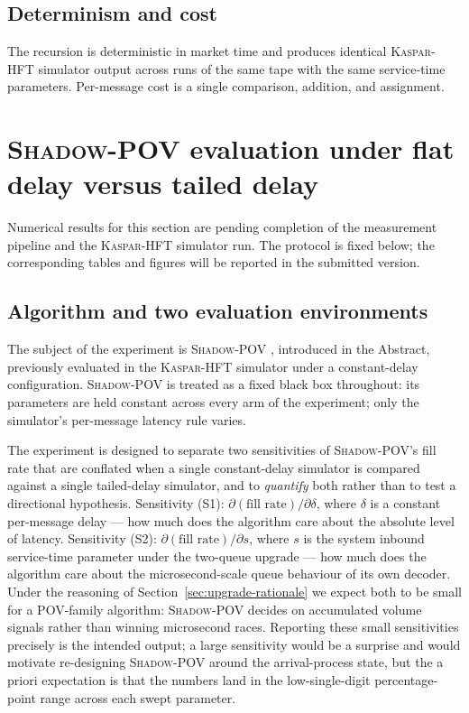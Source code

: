 \documentclass[11pt]{article}
\newcommand{\kasparhft}{\textsc{Kaspar-HFT}}
\newcommand{\shadowpov}{\textsc{Shadow-POV}}
\begin{document}
\subsection{Determinism and cost}
\label{sec:upgrade-determinism}

The recursion is deterministic in market time and produces identical \kasparhft{} simulator output across runs of the same tape with the same service-time parameters. Per-message cost is a single comparison, addition, and assignment.

\section{\shadowpov{} evaluation under flat delay versus tailed delay}
\label{sec:experiment}

Numerical results for this section are pending completion of the measurement pipeline and the \kasparhft{} simulator run. The protocol is fixed below; the corresponding tables and figures will be reported in the submitted version.

\subsection{Algorithm and two evaluation environments}
\label{sec:experiment-design}

The subject of the experiment is \shadowpov{} \citep{mayeski2026shadowpov}, introduced in the Abstract, previously evaluated in the \kasparhft{} simulator under a constant-delay configuration. \shadowpov{} is treated as a fixed black box throughout: its parameters are held constant across every arm of the experiment; only the simulator's per-message latency rule varies.

The experiment is designed to separate two sensitivities of \shadowpov{}'s fill rate that are conflated when a single constant-delay simulator is compared against a single tailed-delay simulator, and to \emph{quantify} both rather than to test a directional hypothesis. Sensitivity (S1): $\partial(\text{fill rate}) / \partial \delta$, where $\delta$ is a constant per-message delay --- how much does the algorithm care about the absolute level of latency. Sensitivity (S2): $\partial(\text{fill rate}) / \partial s$, where $s$ is the system inbound service-time parameter under the two-queue upgrade --- how much does the algorithm care about the microsecond-scale queue behaviour of its own decoder. Under the reasoning of Section~\ref{sec:upgrade-rationale} we expect both to be small for a POV-family algorithm: \shadowpov{} decides on accumulated volume signals rather than winning microsecond races. Reporting these small sensitivities precisely is the intended output; a large sensitivity would be a surprise and would motivate re-designing \shadowpov{} around the arrival-process state, but the a priori expectation is that the numbers land in the low-single-digit percentage-point range across each swept parameter.
\end{document}

